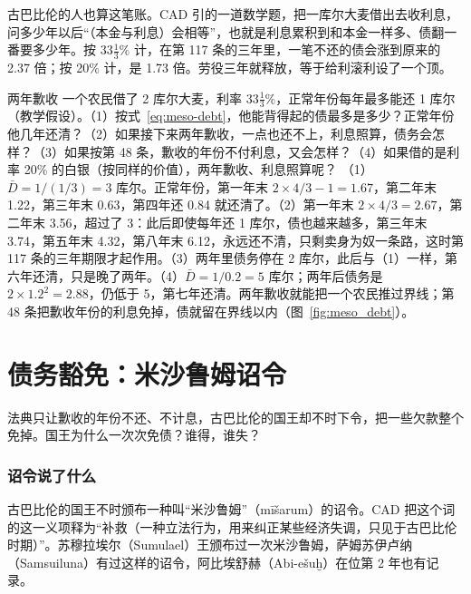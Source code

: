 古巴比伦的人也算这笔账。CAD 引的一道数学题，把一库尔大麦借出去收利息，问多少年以后“（本金与利息）会相等”\cite{cad_s}，也就是利息累积到和本金一样多、债翻一番要多少年。按 $33\tfrac{1}{3}\%$ 计，在第 117 条的三年里，一笔不还的债会涨到原来的 2.37 倍；按 20\% 计，是 1.73 倍。劳役三年就释放，等于给利滚利设了一个顶。


\begin{example}{两年歉收}\label{ex:meso-debt}
一个农民借了 2 库尔大麦，利率 $33\tfrac{1}{3}\%$，正常年份每年最多能还 1 库尔（教学假设）。（1）按式~\eqref{eq:meso-debt}，他能背得起的债最多是多少？正常年份他几年还清？（2）如果接下来两年歉收，一点也还不上，利息照算，债务会怎样？（3）如果按第 48 条，歉收的年份不付利息，又会怎样？（4）如果借的是利率 20\% 的白银（按同样的价值），两年歉收、利息照算呢？
\solution （1）$\bar D=1/(1/3)=3$ 库尔。正常年份，第一年末 $2\times4/3-1=1.67$，第二年末 1.22，第三年末 0.63，第四年还 0.84 就还清了。（2）第一年末 $2\times4/3=2.67$，第二年末 3.56，超过了 3：此后即使每年还 1 库尔，债也越来越多，第三年末 3.74，第五年末 4.32，第八年末 6.12，永远还不清，只剩卖身为奴一条路，这时第 117 条的三年期限才起作用。（3）两年里债务停在 2 库尔，此后与（1）一样，第六年还清，只是晚了两年。（4）$\bar D=1/0.2=5$ 库尔；两年后债务是 $2\times1.2^{2}=2.88$，仍低于 5，第七年还清。两年歉收就能把一个农民推过界线；第 48 条把歉收年份的利息免掉，债就留在界线以内（图~\ref{fig:meso_debt}）。
\end{example}

\section{债务豁免：米沙鲁姆诏令}\label{sec:meso-misharum}

法典只让歉收的年份不还、不计息，古巴比伦的国王却不时下令，把一些欠款整个免掉。国王为什么一次次免债？谁得，谁失？

\subsubsection{诏令说了什么}
古巴比伦的国王不时颁布一种叫“米沙鲁姆”（mīšarum）的诏令。CAD 把这个词的这一义项释为“补救（一种立法行为，用来纠正某些经济失调，只见于古巴比伦时期）”\cite{cad_m2}。苏穆拉埃尔（Sumulael）王颁布过一次米沙鲁姆，萨姆苏伊卢纳（Samsuiluna）有过这样的诏令，阿比埃舒赫（Abi-ešuḫ）在位第 2 年也有记录\cite{cad_m2}。

